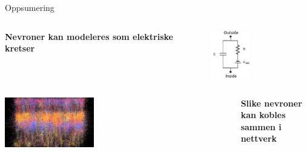 \documentclass[presentation]{beamer}
\begin{document}
  \begin{frame}{Oppsumering}

    \vspace{-15mm}
\begin{columns}

     \begin{center}
        \raggedright
      \bf{Nevroner kan modeleres som elektriske kretser}
     \end{center}
     \begin{center}
            \includegraphics[width=0.4\textwidth]{circuit2.png}
     \end{center}

 \end{columns}

\vspace{5mm}
\pause
 \begin{columns}

      \begin{center}
             \includegraphics[width=0.4\textwidth]{network_large.jpg}
      \end{center}

      \begin{center}
         \raggedright
       \bf{Slike nevroner kan kobles sammen i nettverk}
      \end{center}

  \end{columns}
 \vspace{5mm}


\end{frame}
\end{document}
